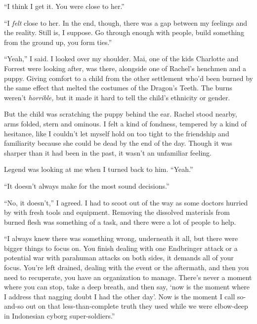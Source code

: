 ``I think I get it.  You were close to her.''



``I \emph{felt} close to her.  In the end, though, there was a gap between my feelings and the reality.  Still is, I suppose.  Go through enough with people, build something from the ground up, you form ties.''



``Yeah,'' I said.  I looked over my shoulder.  Mai, one of the kids Charlotte and Forrest were looking after, was there, alongside one of Rachel's henchmen and a puppy.   Giving comfort to a child from the other settlement who'd been burned by the same effect that melted the costumes of the Dragon's Teeth.  The burns weren't \emph{horrible,} but it made it hard to tell the child's ethnicity or gender.



But the child was scratching the puppy behind the ear.  Rachel stood nearby, arms folded, stern and ominous.  I felt a kind of fondness, tempered by a kind of hesitance, like I couldn't let myself hold on too tight to the friendship and familiarity because she could be dead by the end of the day.  Though it was sharper than it had been in the past, it wasn't an unfamiliar feeling.



Legend was looking at me when I turned back to him.  ``Yeah.''



``It doesn't always make for the most sound decisions.''



``No, it doesn't,'' I agreed.  I had to scoot out of the way as some doctors hurried by with fresh tools and equipment.  Removing the dissolved materials from burned flesh was something of a task, and there were a lot of people to help.



``I always knew there was something wrong, underneath it all, but there were bigger things to focus on.  You finish dealing with one Endbringer attack or a potential war with parahuman attacks on both sides, it demands all of your focus.  You're left drained, dealing with the event or the aftermath, and then you need to recuperate, you have an organization to manage.  There's never a moment where you can stop, take a deep breath, and then say, `now is the moment where I address that nagging doubt I had the other day'.  Now is the moment I call so-and-so out on that less-than-complete truth they used while we were elbow-deep in Indonesian cyborg super-soldiers.''




